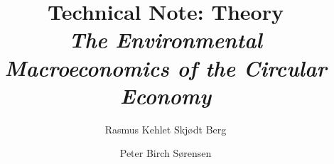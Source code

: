 \documentclass[a4paper]{article}
\begin{document}

\title{Technical Note: Theory \\
\emph{The Environmental Macroeconomics of the Circular Economy}}

\author{Rasmus Kehlet Skjødt Berg
\and
Peter Birch Sørensen
}
\maketitle







\begin{appendices}







\end{appendices}

\printbibliography
\end{document}
